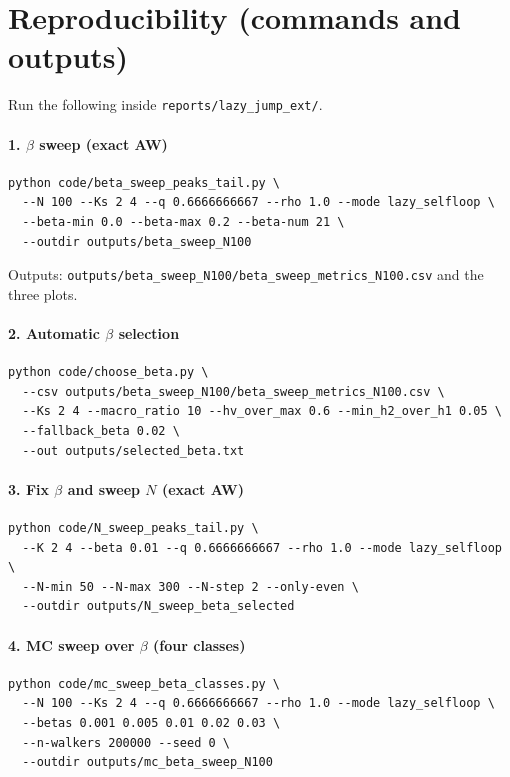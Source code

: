 \section{Reproducibility (commands and outputs)}
Run the following inside \texttt{reports/lazy\_jump\_ext/}.

\paragraph{1. \texorpdfstring{$\beta$}{beta} sweep (exact AW)}
\begin{verbatim}
python code/beta_sweep_peaks_tail.py \
  --N 100 --Ks 2 4 --q 0.6666666667 --rho 1.0 --mode lazy_selfloop \
  --beta-min 0.0 --beta-max 0.2 --beta-num 21 \
  --outdir outputs/beta_sweep_N100
\end{verbatim}
Outputs: \texttt{outputs/beta\_sweep\_N100/beta\_sweep\_metrics\_N100.csv} and the three plots.

\paragraph{2. Automatic \texorpdfstring{$\beta$}{beta} selection}
\begin{verbatim}
python code/choose_beta.py \
  --csv outputs/beta_sweep_N100/beta_sweep_metrics_N100.csv \
  --Ks 2 4 --macro_ratio 10 --hv_over_max 0.6 --min_h2_over_h1 0.05 \
  --fallback_beta 0.02 \
  --out outputs/selected_beta.txt
\end{verbatim}

\paragraph{3. Fix \texorpdfstring{$\beta$}{beta} and sweep \texorpdfstring{$N$}{N} (exact AW)}
\begin{verbatim}
python code/N_sweep_peaks_tail.py \
  --K 2 4 --beta 0.01 --q 0.6666666667 --rho 1.0 --mode lazy_selfloop \
  --N-min 50 --N-max 300 --N-step 2 --only-even \
  --outdir outputs/N_sweep_beta_selected
\end{verbatim}

\paragraph{4. MC sweep over \texorpdfstring{$\beta$}{beta} (four classes)}
\begin{verbatim}
python code/mc_sweep_beta_classes.py \
  --N 100 --Ks 2 4 --q 0.6666666667 --rho 1.0 --mode lazy_selfloop \
  --betas 0.001 0.005 0.01 0.02 0.03 \
  --n-walkers 200000 --seed 0 \
  --outdir outputs/mc_beta_sweep_N100
\end{verbatim}

